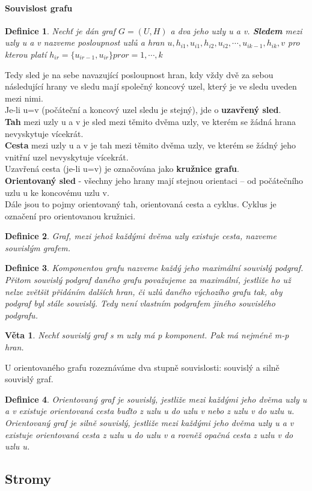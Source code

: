 \documentclass[10pt,a4paper]{article}
\newtheorem{veta}{Věta}
\newtheorem{definition}{Definice}
\begin{document}
\paragraph{Souvislost grafu}
\begin{definition}
Nechť je dán graf $G = (U, H)$ a dva jeho uzly u a v. \textbf{Sledem} mezi uzly u a v nazveme posloupnost uzlů a hran $u, h_{i1}, u_{i1}, h_{i2}, u_{i2}, \cdots , u_{ik-1}, h_{ik}, v$ pro kterou platí $h_{ir} = \{u_{ir-1}, u_{ir} \} pro r = 1,\cdots, k $
\end{definition}
Tedy sled je na sebe navazující posloupnost hran, kdy vždy dvě za sebou následující hrany ve sledu mají společný koncový uzel, který je ve sledu uveden mezi nimi. \\
Je-li u=v (počáteční a koncový uzel sledu je stejný), jde o \textbf{uzavřený sled}. \\
\textbf{Tah} mezi uzly u a v je sled mezi těmito dvěma uzly, ve kterém se žádná hrana nevyskytuje vícekrát. \\
\textbf{Cesta} mezi uzly u a v je tah mezi těmito dvěma uzly, ve kterém se žádný jeho vnitřní uzel nevyskytuje vícekrát. \\
Uzavřená cesta (je-li u=v) je označována jako \textbf{kružnice grafu}. \\
\textbf{Orientovaný sled} - všechny jeho hrany mají stejnou orientaci – od počátečního uzlu u ke koncovému uzlu v. \\
Dále jsou to pojmy orientovaný tah, orientovaná cesta a cyklus. Cyklus je označení pro orientovanou kružnici.
\begin{definition}
Graf, mezi jehož každými dvěma uzly existuje cesta, nazveme souvislým grafem.
\end{definition}
\begin{definition}
Komponentou grafu nazveme každý jeho maximální souvislý podgraf. Přitom souvislý podgraf daného grafu považujeme za maximální, jestliže ho už nelze zvětšit přidáním dalších hran, či uzlů daného výchozího grafu tak, aby podgraf byl stále souvislý. Tedy není vlastním podgrafem jiného souvislého podgrafu.
\end{definition}
\begin{veta}
Nechť souvislý graf s m uzly má p komponent. Pak má nejméně m-p hran.
\end{veta}
U orientovaného grafu rozeznáváme dva stupně souvislosti: souvislý a silně souvislý graf.
\begin{definition}
Orientovaný graf je souvislý, jestliže mezi každými jeho dvěma uzly u a v existuje orientovaná cesta buďto z uzlu u do uzlu v nebo z uzlu v do uzlu u.
Orientovaný graf je silně souvislý, jestliže mezi každými jeho dvěma uzly u a v existuje orientovaná cesta z uzlu u do uzlu v a rovněž opačná cesta z uzlu v do uzlu u.
\end{definition}

\subsection{Stromy}
\end{document}
